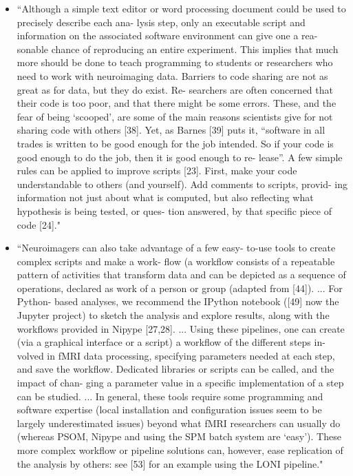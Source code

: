 \documentclass[pdftex,english,11pt,parskip=half]{scrartcl}
\begin{document}
\begin{itemize}
\item ``Although a simple text editor or word processing document could be used to precisely describe each ana- lysis step, only an executable script and information on the associated software environment can give one a rea- sonable chance of reproducing an entire experiment. This implies that much more should be done to teach programming to students or researchers who need to work with neuroimaging data. Barriers to code sharing are not as great as for data, but they do exist. Re- searchers are often concerned that their code is too poor, and that there might be some errors. These, and the fear of being ‘scooped’, are some of the main reasons scientists give for not sharing code with others [38]. Yet, as Barnes [39] puts it, “software in all trades is written to be good enough for the job intended. So if your code is good enough to do the job, then it is good enough to re- lease”. A few simple rules can be applied to improve scripts [23]. First, make your code understandable to others (and yourself). Add comments to scripts, provid- ing information not just about what is computed, but also reflecting what hypothesis is being tested, or ques- tion answered, by that specific piece of code [24]." \cite{pernet2015improving}
\item ``Neuroimagers can also take advantage of a few easy- to-use tools to create complex scripts and make a work- flow (a workflow consists of a repeatable pattern of activities that transform data and can be depicted as a sequence of operations, declared as work of a person or group (adapted from [44]). ... For Python- based analyses, we recommend the IPython notebook ([49] now the Jupyter project) to sketch the analysis and explore results, along with the workflows provided in Nipype [27,28]. ... Using these pipelines, one can create (via a graphical interface or a script) a workflow of the different steps in- volved in fMRI data processing, specifying parameters needed at each step, and save the workflow. Dedicated libraries or scripts can be called, and the impact of chan- ging a parameter value in a specific implementation of a step can be studied. ... In general, these tools require some programming and software expertise (local installation and configuration issues seem to be largely underestimated issues) beyond what fMRI researchers can usually do (whereas PSOM, Nipype and using the SPM batch system are ‘easy’). These more complex workflow or pipeline solutions can, however, ease replication of the analysis by others: see [53] for an example using the LONI pipeline." \cite{pernet2015improving}

\end{itemize}
\end{document}
